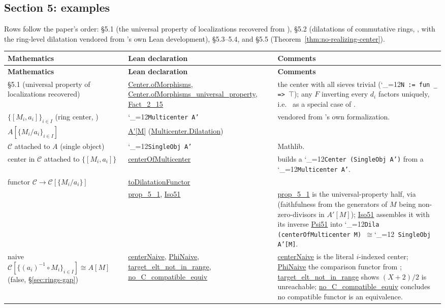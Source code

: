 \documentclass[11pt]{amsart}
\newcommand{\lc}[1]{\url{#1}}
\newcommand{\lcode}{\begingroup\catcode`\_=12\relax\lcodeInner}
\newcommand{\lcodeInner}[1]{\texttt{#1}\endgroup}
\theoremstyle{plain}
\theoremstyle{definition}
\theoremstyle{remark}
\newcommand{\calC}{\mathcal C}
\begin{document}
\subsection{Section 5: examples}
\label{sec:dict-5}

Rows follow the paper's order: \S5.1 (the universal property of localizations recovered
from \citep[Theorem~3.10]{Mayeux}), \S5.2 (dilatations of commutative rings,
\citep[Proposition~5.1]{Mayeux}, with the ring-level dilatation vendored from \citep{M}'s
own Lean development), \S5.3--5.4, and \S5.5 (Theorem~\ref{thm:no-realizing-center}).

\begingroup
\renewcommand{\arraystretch}{1.15}
\begin{longtable}{@{}p{2.55cm}p{4.1cm}p{4.75cm}@{}}
\toprule
\textbf{Mathematics} & \textbf{Lean declaration} & \textbf{Comments} \\
\midrule
\endfirsthead
\toprule
\textbf{Mathematics} & \textbf{Lean declaration} & \textbf{Comments} \\
\midrule
\endhead
\bottomrule
\endfoot
\S5.1 (universal property of localizations recovered) & \lc{Center.ofMorphisms}, \lc{Center.ofMorphisms_universal_property}, \lc{Fact_2_15} & the center with all sieves trivial (\lcode{N := fun _ => }\ensuremath{\top}); any $F$ inverting every $d_i$ factors uniquely, i.e.\ \citep[Proposition~2.8]{Mayeux} as a special case of \citep[Theorem~3.10]{Mayeux}. \\
$\{[M_i,a_i]\}_{i\in I}$ (ring center, \citep{M}) & \lcode{Multicenter A'} & vendored from \citep{M}'s own formalization. \\
$A[\{M_i/a_i\}_{i\in I}]$ & \lc{A'[M]} (\lc{Multicenter.Dilatation}) & \\
$\calC$ attached to $A$ (single object) & \lcode{SingleObj A'} & Mathlib. \\
center in $\calC$ attached to $\{[M_i,a_i]\}$ & \lc{centerOfMulticenter} & builds a \lcode{Center (SingleObj A')} from a \lcode{Multicenter A'}. \\
functor $\calC \to \calC[\{M_i/a_i\}]$ & \lc{toDilatationFunctor} & \\
\citep[Proposition~5.1]{Mayeux} & \lc{prop_5_1}, \lc{Iso51} & \lc{prop_5_1} is the universal-property half, via \citep[Theorem~3.10]{Mayeux} (faithfulness from the generators of $M$ being non-zero-divisors in $A'[M]$); \lc{Iso51} assembles it with its inverse \lc{Psi51} into \lcode{Dila (centerOfMulticenter M) }\ensuremath{\cong}\lcode{ SingleObj A'[M]}. \\
naive $\calC[\{(a_i)^{-1}\circ M_i\}_{i\in I}] \cong A[M]$ (false, \S\ref{sec:rings-gap}) & \lc{centerNaive}, \lc{PhiNaive}, \lc{target_elt_not_in_range}, \lc{no_C_compatible_equiv} & \lc{centerNaive} is the literal $i$-indexed center; \lc{PhiNaive} the comparison functor from \citep[Theorem~3.10]{Mayeux}; \lc{target_elt_not_in_range} shows $(X{+}2)/2$ is unreachable; \lc{no_C_compatible_equiv} concludes no compatible functor is an equivalence. \\

\end{longtable}
\end{document}
